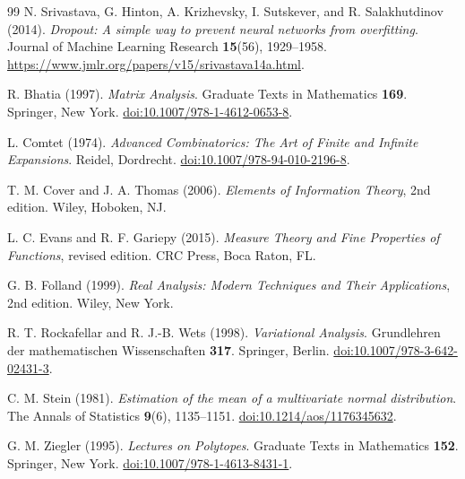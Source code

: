 \documentclass[11pt,letterpaper]{article}
\theoremstyle{remark}
\begin{document}
\begin{thebibliography}{99}
N. Srivastava, G. Hinton, A. Krizhevsky, I. Sutskever, and
R. Salakhutdinov (2014).
\emph{Dropout: A simple way to prevent neural networks from overfitting}.
Journal of Machine Learning Research \textbf{15}(56), 1929--1958.
\url{https://www.jmlr.org/papers/v15/srivastava14a.html}.

R. Bhatia (1997).
\emph{Matrix Analysis}.
Graduate Texts in Mathematics \textbf{169}. Springer, New York.
\href{https://doi.org/10.1007/978-1-4612-0653-8}{doi:10.1007/978-1-4612-0653-8}.

L. Comtet (1974).
\emph{Advanced Combinatorics: The Art of Finite and Infinite Expansions}.
Reidel, Dordrecht.
\href{https://doi.org/10.1007/978-94-010-2196-8}{doi:10.1007/978-94-010-2196-8}.

T. M. Cover and J. A. Thomas (2006).
\emph{Elements of Information Theory}, 2nd edition.
Wiley, Hoboken, NJ.

L. C. Evans and R. F. Gariepy (2015).
\emph{Measure Theory and Fine Properties of Functions}, revised edition.
CRC Press, Boca Raton, FL.

G. B. Folland (1999).
\emph{Real Analysis: Modern Techniques and Their Applications}, 2nd edition.
Wiley, New York.

R. T. Rockafellar and R. J.-B. Wets (1998).
\emph{Variational Analysis}.
Grundlehren der mathematischen Wissenschaften \textbf{317}.
Springer, Berlin.
\href{https://doi.org/10.1007/978-3-642-02431-3}{doi:10.1007/978-3-642-02431-3}.

C. M. Stein (1981).
\emph{Estimation of the mean of a multivariate normal distribution}.
The Annals of Statistics \textbf{9}(6), 1135--1151.
\href{https://doi.org/10.1214/aos/1176345632}{doi:10.1214/aos/1176345632}.

G. M. Ziegler (1995).
\emph{Lectures on Polytopes}.
Graduate Texts in Mathematics \textbf{152}. Springer, New York.
\href{https://doi.org/10.1007/978-1-4613-8431-1}{doi:10.1007/978-1-4613-8431-1}.

\end{thebibliography}

\clearpage
\appendix
{}
\end{document}
